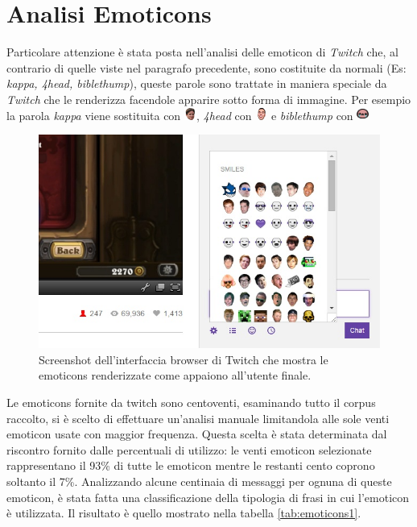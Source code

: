 \documentclass[a4paper,12pt,openright,twoside]{report}
\theoremstyle{definition}
\begin{document}
\section{Analisi Emoticons}
Particolare attenzione è stata posta nell'analisi delle emoticon di \emph{Twitch} che,
al contrario di quelle viste nel paragrafo precedente, sono costituite da normali (Es: \emph{kappa, 4head, biblethump}),
queste parole sono trattate in maniera speciale da \emph{Twitch} che le renderizza facendole apparire sotto forma di immagine.
Per esempio la parola \emph{kappa} viene sostituita con 
\includegraphics[height=0.4cm, width=0.4cm]{Immagini/Emoticons/kappahd.png}, 
\emph{4head} con \includegraphics[height=0.4cm, width=0.4cm]{Immagini/Emoticons/4head.png} e 
\emph{biblethump} con
\includegraphics[height=0.4cm, width=0.4cm]{Immagini/Emoticons/biblethump.png} 

\begin{figure}[ht]
	\centering
	\includegraphics[scale=0.5]{Immagini/TwitchEmotes.jpg}
	\caption{Screenshot dell'interfaccia browser di Twitch che mostra le emoticons renderizzate
	come appaiono all'utente finale.}
	\label{fig:TwitchEmotes}
\end{figure}

Le emoticons fornite da twitch sono centoventi, esaminando tutto il corpus raccolto, si è scelto 
di effettuare un'analisi
manuale limitandola alle sole venti emoticon usate con maggior frequenza. 
Questa scelta è stata determinata 
dal riscontro fornito dalle percentuali di utilizzo: le venti emoticon selezionate rappresentano 
il 93\% di tutte le emoticon mentre le restanti cento coprono soltanto il 7\%. 
Analizzando alcune centinaia di messaggi 
per ognuna di queste emoticon,
è stata fatta una classificazione della tipologia di frasi in cui l'emoticon è utilizzata. Il risultato è
quello mostrato nella tabella \ref{tab:emoticons1}.
\end{document}
